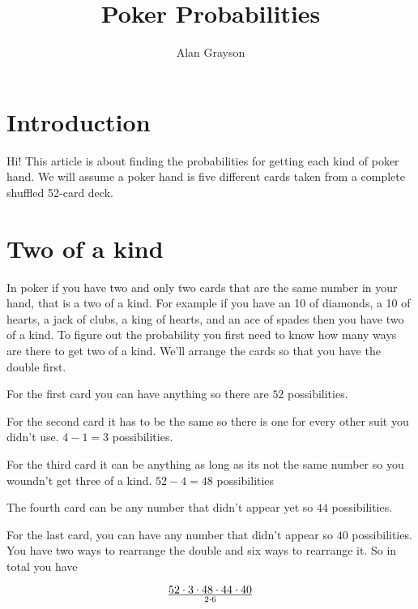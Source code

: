 \documentclass[12pt]{article}
\begin{document}
\title{Poker Probabilities}
\author{Alan Grayson}
\maketitle

\section*{Introduction}

Hi! This article is about finding the probabilities for getting each kind of poker hand. 
We will assume a poker hand is five different cards taken from a complete shuffled 52-card deck. 

\section{Two of a kind}

In poker if you have two and only two cards that are the same number in your hand, that is a two of a kind.
For example if you have an 10 of diamonds, a 10 of hearts, a jack of clubs, a king of hearts, and an ace of spades then you have two of a kind.
To figure out the probability you first need to know how many ways are there to get two of a kind.
We'll arrange the cards so that you have the double first.

For the first card you can have anything so there are $52$ possibilities.

For the second card it has to be the same so there is one for every other suit you didn't use. $4 - 1 = 3$ possibilities.

For the third card it can be anything as long as its not the same number so you woundn't get three of a kind. $52 - 4 = 48$ possibilities

The fourth card can be any number that didn't appear yet so $44$ possibilities.

For the last card, you can have any number that didn't appear so $40$ possibilities.
You have two ways to rearrange the double and six ways to rearrange it.
So in total you have 

\begin{equation} 
52\cdot3\cdot48\cdot44\cdot40\over2\cdot6
\end{equation}
\end{document}
